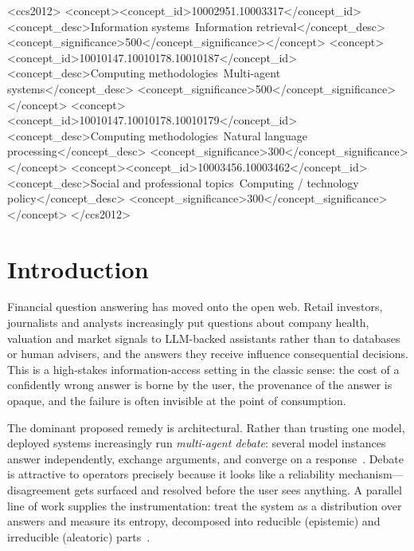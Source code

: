 \documentclass[sigconf,anonymous,review]{acmart}
\begin{document}
\begin{CCSXML}
<ccs2012>
<concept><concept_id>10002951.10003317</concept_id>
<concept_desc>Information systems~Information retrieval</concept_desc>
<concept_significance>500</concept_significance></concept>
<concept><concept_id>10010147.10010178.10010187</concept_id>
<concept_desc>Computing methodologies~Multi-agent systems</concept_desc>
<concept_significance>500</concept_significance></concept>
<concept><concept_id>10010147.10010178.10010179</concept_id>
<concept_desc>Computing methodologies~Natural language processing</concept_desc>
<concept_significance>300</concept_significance></concept>
<concept><concept_id>10003456.10003462</concept_id>
<concept_desc>Social and professional topics~Computing / technology policy</concept_desc>
<concept_significance>300</concept_significance></concept>
</ccs2012>
\end{CCSXML}



\maketitle

\section{Introduction}

Financial question answering has moved onto the open web. Retail investors,
journalists and analysts increasingly put questions about company health,
valuation and market signals to LLM-backed assistants rather than to
databases or human advisers, and the answers they receive influence
consequential decisions. This is a high-stakes information-access setting in
the classic sense: the cost of a confidently wrong answer is borne by the
user, the provenance of the answer is opaque, and the failure is often
invisible at the point of consumption.

The dominant proposed remedy is architectural. Rather than trusting one
model, deployed systems increasingly run \emph{multi-agent debate}: several
model instances answer independently, exchange arguments, and converge on a
response~\cite{du2023debate}. Debate is attractive to operators precisely
because it looks like a reliability mechanism---disagreement gets surfaced
and resolved before the user sees anything. A parallel line of work supplies
the instrumentation: treat the system as a distribution over answers and
measure its entropy, decomposed into reducible (epistemic) and irreducible
(aleatoric) parts~\cite{kuhn2023semantic,depeweg2018decomposition}.
\end{document}
